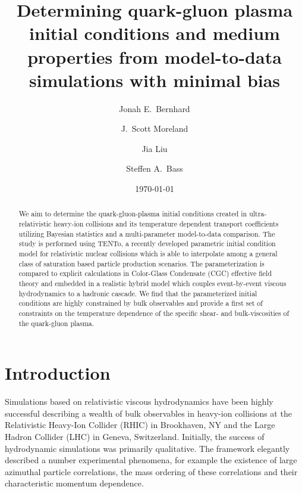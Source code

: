 \documentclass[aps,prc,reprint,amsmath,nofootinbib,superscriptaddress]{revtex4-1}
\newcommand{\trento}{T\raisebox{-0.5ex}{R}ENTo}
\begin{document}
\title{Determining quark-gluon plasma initial conditions and medium \\ properties from model-to-data simulations with minimal bias}

\author{Jonah E.\ Bernhard}
\author{J.\ Scott Moreland}

\author{Jia Liu}

\author{Steffen A.\ Bass}

\date{\today}

\begin{abstract}
We aim to determine the quark-gluon-plasma initial conditions created in ultra-relativistic heavy-ion collisions and its temperature dependent transport coefficients utilizing Bayesian statistics and a multi-parameter model-to-data comparison.
The study is performed using \trento, a recently developed parametric initial condition model for relativistic nuclear collisions which is able to interpolate among a general class of saturation based particle production scenarios.
The parameterization is compared to explicit calculations in Color-Glass Condensate (CGC) effective field theory and embedded in a realistic hybrid model which couples event-by-event viscous hydrodynamics to a hadronic cascade.
We find that the parameterized initial conditions are highly constrained by bulk observables and provide a first set of constraints on the temperature dependence of the specific shear- and bulk-viscosities of the quark-gluon plasma.
\end{abstract}

\maketitle


\section{Introduction}

Simulations based on relativistic viscous hydrodynamics have been highly successful describing a wealth of bulk observables in heavy-ion collisions at the Relativistic Heavy-Ion Collider (RHIC) in Brookhaven, NY and the Large Hadron Collider (LHC) in Geneva, Switzerland.
Initially, the success of hydrodynamic simulations was primarily qualitative. The framework elegantly described a number experimental phenomena, for example the existence of large azimuthal particle correlations, the mass ordering of these correlations and their characteristic momentum dependence.
\end{document}
